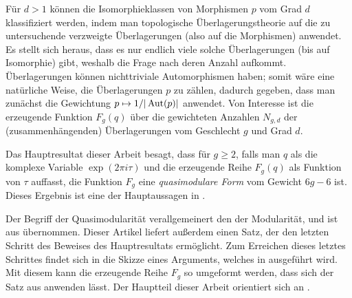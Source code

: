 Für $d>1$ können die Isomorphieklassen von Morphismen $p$ vom Grad $d$ klassifiziert werden, indem man topologische Überlagerungstheorie auf die zu untersuchende verzweigte Überlagerungen (also auf die Morphismen) anwendet. Es stellt sich heraus, dass es nur endlich viele solche Überlagerungen (bis auf Isomorphie) gibt, weshalb die Frage nach deren Anzahl aufkommt. Überlagerungen können nichttriviale Automorphismen haben; somit wäre eine natürliche Weise, die Überlagerungen $p$ zu zählen, dadurch gegeben, dass man zunächst die Gewichtung $p\mapsto 1/|\operatorname{Aut}(p)|$ anwendet. Von Interesse ist die erzeugende Funktion $F_g(q)$ über die gewichteten Anzahlen $N_{g,d}$ der (zusammenhängenden) Überlagerungen vom Geschlecht $g$ und Grad $d$.

Das Hauptresultat dieser Arbeit besagt, dass für $g\geq 2$, falls man $q$ als die komplexe Variable $\exp(2\pi i\tau)$ und die erzeugende Reihe $F_g(q)$ als Funktion von $\tau$ auffasst, die Funktion $F_g$ eine \emph{quasimodulare Form} vom Gewicht $6g-6$ ist. Dieses Ergebnis ist eine der Hauptaussagen in \cite{Dijkgraaf}.

Der Begriff der Quasimodularität verallgemeinert den der Modularität, und ist aus \cite{Kaneko-Zagier1995} übernommen. Dieser Artikel liefert außerdem einen Satz, der den letzten Schritt des Beweises des Hauptresultats ermöglicht. Zum Erreichen dieses letztes Schrittes findet sich in \cite{Dijkgraaf} die Skizze eines Arguments, welches in \cite{Roth} ausgeführt wird. Mit diesem kann die erzeugende Reihe $F_g$ so umgeformt werden, dass sich der Satz aus \cite{Kaneko-Zagier1995} anwenden lässt. Der Hauptteil dieser Arbeit orientiert sich an \cite{Roth}.


